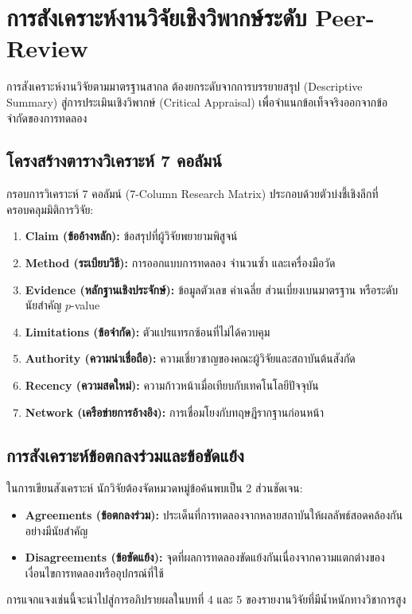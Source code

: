 \chapter{การสังเคราะห์งานวิจัยเชิงวิพากษ์ระดับ Peer-Review}

การสังเคราะห์งานวิจัยตามมาตรฐานสากล ต้องยกระดับจากการบรรยายสรุป (Descriptive Summary) สู่การประเมินเชิงวิพากษ์ (Critical Appraisal) เพื่อจำแนกข้อเท็จจริงออกจากข้อจำกัดของการทดลอง

\section{โครงสร้างตารางวิเคราะห์ 7 คอลัมน์}

กรอบการวิเคราะห์ 7 คอลัมน์ (7-Column Research Matrix) ประกอบด้วยตัวบ่งชี้เชิงลึกที่ครอบคลุมมิติการวิจัย:
\begin{enumerate}
    \item \textbf{Claim (ข้ออ้างหลัก):} ข้อสรุปที่ผู้วิจัยพยายามพิสูจน์
    \item \textbf{Method (ระเบียบวิธี):} การออกแบบการทดลอง จำนวนซ้ำ และเครื่องมือวัด
    \item \textbf{Evidence (หลักฐานเชิงประจักษ์):} ข้อมูลตัวเลข ค่าเฉลี่ย ส่วนเบี่ยงเบนมาตรฐาน หรือระดับนัยสำคัญ $p$-value
    \item \textbf{Limitations (ข้อจำกัด):} ตัวแปรแทรกซ้อนที่ไม่ได้ควบคุม
    \item \textbf{Authority (ความน่าเชื่อถือ):} ความเชี่ยวชาญของคณะผู้วิจัยและสถาบันต้นสังกัด
    \item \textbf{Recency (ความสดใหม่):} ความก้าวหน้าเมื่อเทียบกับเทคโนโลยีปัจจุบัน
    \item \textbf{Network (เครือข่ายการอ้างอิง):} การเชื่อมโยงกับทฤษฎีรากฐานก่อนหน้า
\end{enumerate}

\section{การสังเคราะห์ข้อตกลงร่วมและข้อขัดแย้ง}

ในการเขียนสังเคราะห์ นักวิจัยต้องจัดหมวดหมู่ข้อค้นพบเป็น 2 ส่วนชัดเจน:
\begin{itemize}
    \item \textbf{Agreements (ข้อตกลงร่วม):} ประเด็นที่การทดลองจากหลายสถาบันให้ผลลัพธ์สอดคล้องกันอย่างมีนัยสำคัญ
    \item \textbf{Disagreements (ข้อขัดแย้ง):} จุดที่ผลการทดลองขัดแย้งกันเนื่องจากความแตกต่างของเงื่อนไขการทดลองหรืออุปกรณ์ที่ใช้
\end{itemize}

การแจกแจงเช่นนี้จะนำไปสู่การอภิปรายผลในบทที่ 4 และ 5 ของรายงานวิจัยที่มีน้ำหนักทางวิชาการสูง
